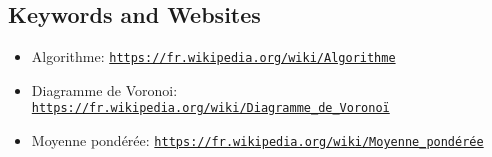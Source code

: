 \documentclass[a4paper,11pt]{report}
\newcommand{\BrochureUrlText}[1]{\texttt{#1}}
\begin{document}
{\raggedright

\subsection*{Keywords and Websites}

\begin{itemize}
  \item Algorithme: \href{https://fr.wikipedia.org/wiki/Algorithme}{\BrochureUrlText{https://fr.wikipedia.org/wiki/Algorithme}}
  \item Diagramme de Voronoi: \href{https://fr.wikipedia.org/wiki/Diagramme_de_Vorono\%C3\%AF}{\BrochureUrlText{https://fr.wikipedia.org/wiki/Diagramme\_de\_Voronoï}}
  \item Moyenne pondérée: \href{https://fr.wikipedia.org/wiki/Moyenne_pond\%C3\%A9r\%C3\%A9e}{\BrochureUrlText{https://fr.wikipedia.org/wiki/Moyenne\_pondérée}}
\end{itemize}


}
\end{document}
